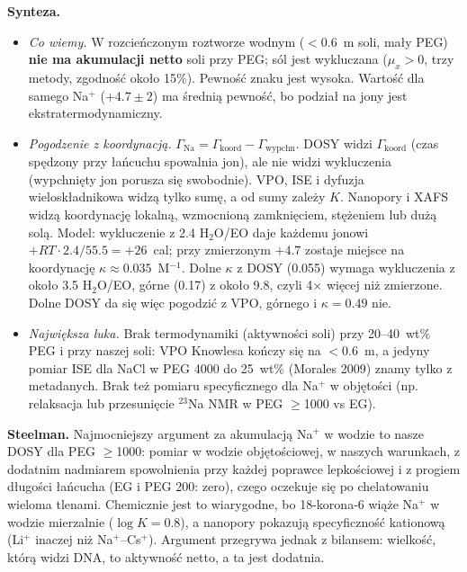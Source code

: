 \documentclass[10pt,a4paper]{article}
\begin{document}
\textbf{Synteza.}
\begin{itemize}[leftmargin=*]
\item \emph{Co wiemy.} W rozcieńczonym roztworze wodnym ($<0.6$~m soli, mały PEG) \textbf{nie ma akumulacji netto} soli przy PEG; sól jest wykluczana ($\mu_x>0$, trzy metody, zgodność około 15\%). Pewność znaku jest wysoka. Wartość dla samego Na$^+$ ($+4.7\pm2$) ma średnią pewność, bo podział na jony jest ekstratermodynamiczny.
\item \emph{Pogodzenie z koordynacją.} $\Gamma_\text{Na}=\Gamma_\text{koord}-\Gamma_\text{wypchn}$. DOSY widzi $\Gamma_\text{koord}$ (czas spędzony przy łańcuchu spowalnia jon), ale nie widzi wykluczenia (wypchnięty jon porusza się swobodnie). VPO, ISE i dyfuzja wieloskładnikowa widzą tylko sumę, a od sumy zależy $K$. Nanopory i XAFS widzą koordynację lokalną, wzmocnioną zamknięciem, stężeniem lub dużą solą. Model: wykluczenie z 2.4 H$_2$O/EO daje każdemu jonowi $+RT\cdot2.4/55.5=+26$~cal; przy zmierzonym $+4.7$ zostaje miejsce na koordynację $\kappa\approx0.035$~M$^{-1}$. Dolne $\kappa$ z DOSY (0.055) wymaga wykluczenia z około 3.5 H$_2$O/EO, górne (0.17) z około 9.8, czyli 4× więcej niż zmierzone. Dolne DOSY da się więc pogodzić z VPO, górnego i $\kappa=0.49$ nie.
\item \emph{Największa luka.} Brak termodynamiki (aktywności soli) przy 20--40~wt\% PEG i przy naszej soli: VPO Knowlesa kończy się na $<0.6$~m, a jedyny pomiar ISE dla NaCl w PEG 4000 do 25~wt\% (Morales 2009) znamy tylko z metadanych. Brak też pomiaru specyficznego dla Na$^+$ w objętości (np. relaksacja lub przesunięcie $^{23}$Na NMR w PEG $\ge$1000 vs EG).
\end{itemize}

\textbf{Steelman.} Najmocniejszy argument za akumulacją Na$^+$ w wodzie to nasze DOSY dla PEG $\ge$1000: pomiar w wodzie objętościowej, w naszych warunkach, z dodatnim nadmiarem spowolnienia przy każdej poprawce lepkościowej i z progiem długości łańcucha (EG i PEG 200: zero), czego oczekuje się po chelatowaniu wieloma tlenami. Chemicznie jest to wiarygodne, bo 18-korona-6 wiąże Na$^+$ w wodzie mierzalnie ($\log K=0.8$), a nanopory pokazują specyficzność kationową (Li$^+$ inaczej niż Na$^+$--Cs$^+$). Argument przegrywa jednak z bilansem: wielkość, którą widzi DNA, to aktywność netto, a ta jest dodatnia.
\end{document}
